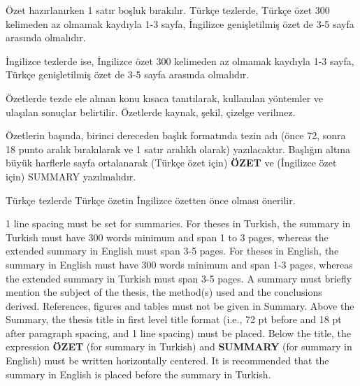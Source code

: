 Özet hazırlanırken 1 satır boşluk bırakılır. Türkçe tezlerde, Türkçe özet 300 kelimeden
az olmamak kaydıyla 1-3 sayfa, İngilizce genişletilmiş özet de 3-5 sayfa arasında olmalıdır.

İngilizce tezlerde ise, İngilizce özet 300 kelimeden az olmamak kaydıyla 1-3 sayfa, Türkçe genişletilmiş özet de 3-5 sayfa arasında olmalıdır.

Özetlerde tezde ele alınan konu kısaca tanıtılarak, kullanılan yöntemler ve ulaşılan sonuçlar belirtilir. Özetlerde kaynak, şekil, çizelge verilmez.

Özetlerin başında, birinci dereceden başlık formatında tezin adı (önce 72, sonra 18  punto  aralık  bırakılarak  ve  1  satır  aralıklı  olarak)  yazılacaktır.   Başlığın  altına büyük harflerle sayfa ortalanarak (Türkçe özet için) \textbf{ÖZET} ve (İngilizce özet için) SUMMARY yazılmalıdır.

Türkçe tezlerde Türkçe özetin İngilizce özetten önce olması önerilir.

1 line spacing must be set for summaries. For theses in Turkish, the summary in Turkish must have 300 words minimum and span 1 to 3 pages, whereas the extended summary in English must span 3-5 pages.
For theses in English, the summary in English must have 300 words minimum and span 1-3 pages, whereas the extended summary in Turkish must span 3-5 pages.
A summary must briefly mention the subject of the thesis, the method(s) used and the conclusions derived.
References, figures and tables must not be given in Summary.
Above the Summary, the thesis title in first level title format (i.e., 72 pt before and 18 pt after paragraph spacing, and 1 line spacing) must be placed. Below the title, the expression \textbf{ÖZET} (for summary in Turkish) and \textbf{SUMMARY} (for summary in English) must be written horizontally centered.
It is recommended that the summary in English is placed before the summary in Turkish.

